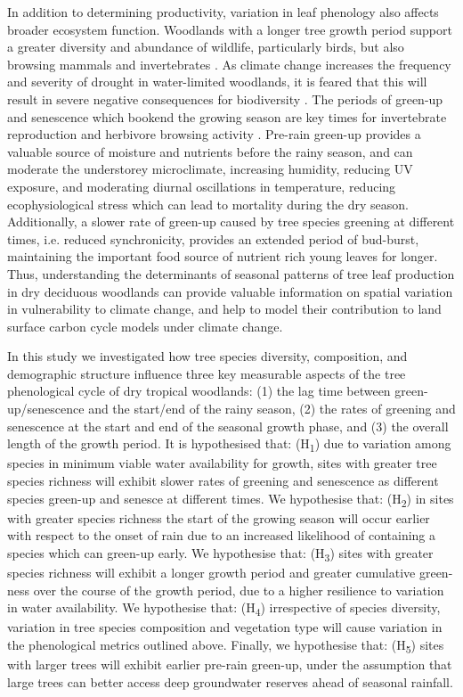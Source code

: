 \documentclass[11pt,a4paper]{article}
\begin{document}
In addition to determining productivity, variation in leaf phenology also affects broader ecosystem function. Woodlands with a longer tree growth period support a greater diversity and abundance of wildlife, particularly birds, but also browsing mammals and invertebrates \citep{Cole2015, Araujo2017, Morellato2016, Ogutu2013}. As climate change increases the frequency and severity of drought in water-limited woodlands, it is feared that this will result in severe negative consequences for biodiversity \citep{Bale2002}. The periods of green-up and senescence which bookend the growing season are key times for invertebrate reproduction \citep{Prather2012} and herbivore browsing activity \citep{Velasque2016, Morellato2016}. Pre-rain green-up provides a valuable source of moisture and nutrients before the rainy season, and can moderate the understorey microclimate, increasing humidity, reducing UV exposure, and moderating diurnal oscillations in temperature, reducing ecophysiological stress which can lead to mortality during the dry season. Additionally, a slower rate of green-up caused by tree species greening at different times, i.e. reduced synchronicity, provides an extended period of bud-burst, maintaining the important food source of nutrient rich young leaves for longer. Thus, understanding the determinants of seasonal patterns of tree leaf production in dry deciduous woodlands can provide valuable information on spatial variation in vulnerability to climate change, and help to model their contribution to land surface carbon cycle models under climate change.
 
In this study we investigated how tree species diversity, composition, and demographic structure influence three key measurable aspects of the tree phenological cycle of dry tropical woodlands: (1) the lag time between green-up/senescence and the start/end of the rainy season, (2) the rates of greening and senescence at the start and end of the seasonal growth phase, and (3) the overall length of the growth period. It is hypothesised that: (H\textsubscript{1}) due to variation among species in minimum viable water availability for growth, sites with greater tree species richness will exhibit slower rates of greening and senescence as different species green-up and senesce at different times. We hypothesise that: (H\textsubscript{2}) in sites with greater species richness the start of the growing season will occur earlier with respect to the onset of rain due to an increased likelihood of containing a species which can green-up early. We hypothesise that: (H\textsubscript{3}) sites with greater species richness will exhibit a longer growth period and greater cumulative green-ness over the course of the growth period, due to a higher resilience to variation in water availability. We hypothesise that: (H\textsubscript{4}) irrespective of species diversity, variation in tree species composition and vegetation type will cause variation in the phenological metrics outlined above. Finally, we hypothesise that: (H\textsubscript{5}) sites with larger trees will exhibit earlier pre-rain green-up, under the assumption that large trees can better access deep groundwater reserves ahead of seasonal rainfall.
\end{document}
